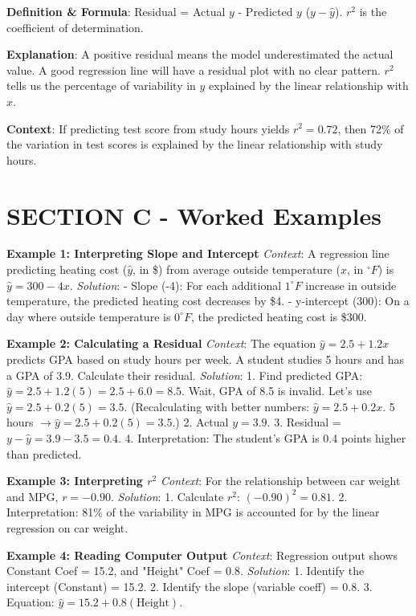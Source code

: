 \begin{lessonbox}
\textbf{Definition \& Formula}: Residual = Actual $y$ - Predicted $y$ ($y - \hat{y}$). $r^2$ is the coefficient of determination.

\textbf{Explanation}: A positive residual means the model underestimated the actual value. A good regression line will have a residual plot with no clear pattern. $r^2$ tells us the percentage of variability in $y$ explained by the linear relationship with $x$.

\textbf{Context}: If predicting test score from study hours yields $r^2 = 0.72$, then 72\% of the variation in test scores is explained by the linear relationship with study hours.
\end{lessonbox}

\section{SECTION C - Worked Examples}

\textbf{Example 1: Interpreting Slope and Intercept}
\textit{Context}: A regression line predicting heating cost ($\hat{y}$, in \$) from average outside temperature ($x$, in $^\circ F$) is $\hat{y} = 300 - 4x$.
\textit{Solution}:
- Slope (-4): For each additional $1^\circ F$ increase in outside temperature, the predicted heating cost decreases by \$4.
- y-intercept (300): On a day where outside temperature is $0^\circ F$, the predicted heating cost is \$300.

\textbf{Example 2: Calculating a Residual}
\textit{Context}: The equation $\hat{y} = 2.5 + 1.2x$ predicts GPA based on study hours per week. A student studies 5 hours and has a GPA of 3.9. Calculate their residual.
\textit{Solution}:
1. Find predicted GPA: $\hat{y} = 2.5 + 1.2(5) = 2.5 + 6.0 = 8.5$. Wait, GPA of 8.5 is invalid. Let's use $\hat{y} = 2.5 + 0.2(5) = 3.5$.
(Recalculating with better numbers: $\hat{y} = 2.5 + 0.2x$. 5 hours $\rightarrow \hat{y} = 2.5 + 0.2(5) = 3.5$.)
2. Actual $y = 3.9$.
3. Residual = $y - \hat{y} = 3.9 - 3.5 = 0.4$.
4. Interpretation: The student's GPA is 0.4 points higher than predicted.

\textbf{Example 3: Interpreting $r^2$}
\textit{Context}: For the relationship between car weight and MPG, $r = -0.90$.
\textit{Solution}:
1. Calculate $r^2$: $(-0.90)^2 = 0.81$.
2. Interpretation: 81\% of the variability in MPG is accounted for by the linear regression on car weight.

\textbf{Example 4: Reading Computer Output}
\textit{Context}: Regression output shows Constant Coef = 15.2, and "Height" Coef = 0.8.
\textit{Solution}:
1. Identify the intercept (Constant) = 15.2.
2. Identify the slope (variable coeff) = 0.8.
3. Equation: $\hat{y} = 15.2 + 0.8(\text{Height})$.

